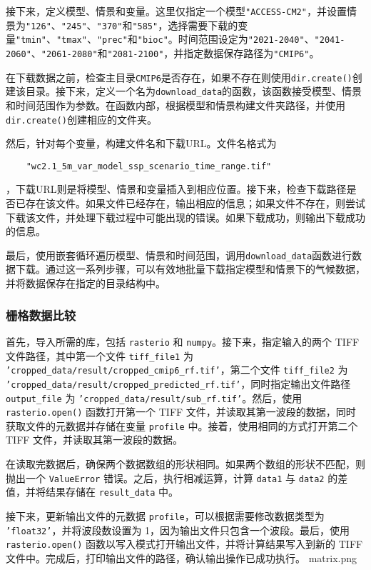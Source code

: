 \documentclass{article}
\begin{document}
接下来，定义模型、情景和变量。这里仅指定一个模型\texttt{"ACCESS-CM2"}，并设置情景为\texttt{"126"}、\texttt{"245"}、\texttt{"370"}和\texttt{"585"}，选择需要下载的变量\texttt{"tmin"}、\texttt{"tmax"}、\texttt{"prec"}和\texttt{"bioc"}。时间范围设定为\texttt{"2021-2040"}、\texttt{"2041-2060"}、\texttt{"2061-2080"}和\texttt{"2081-2100"}，并指定数据保存路径为\texttt{"CMIP6"}。

在下载数据之前，检查主目录\texttt{CMIP6}是否存在，如果不存在则使用\texttt{dir.create()}创建该目录。接下来，定义一个名为\texttt{download\_data}的函数，该函数接受模型、情景和时间范围作为参数。在函数内部，根据模型和情景构建文件夹路径，并使用\texttt{dir.create()}创建相应的文件夹。

然后，针对每个变量，构建文件名和下载URL。文件名格式为
\begin{lstlisting}
	"wc2.1_5m_var_model_ssp_scenario_time_range.tif"
\end{lstlisting}
，下载URL则是将模型、情景和变量插入到相应位置。接下来，检查下载路径是否已存在该文件。如果文件已经存在，输出相应的信息；如果文件不存在，则尝试下载该文件，并处理下载过程中可能出现的错误。如果下载成功，则输出下载成功的信息。

最后，使用嵌套循环遍历模型、情景和时间范围，调用\texttt{download\_data}函数进行数据下载。通过这一系列步骤，可以有效地批量下载指定模型和情景下的气候数据，并将数据保存在指定的目录结构中。


\subsubsection{栅格数据比较}
首先，导入所需的库，包括 \texttt{rasterio} 和 \texttt{numpy}。接下来，指定输入的两个 TIFF 文件路径，其中第一个文件 \texttt{tiff\_file1} 为 \texttt{'cropped\_data/result/cropped\_cmip6\_rf.tif'}，第二个文件 \texttt{tiff\_file2} 为 \texttt{'cropped\_data/result/cropped\_predicted\_rf.tif'}，同时指定输出文件路径 \texttt{output\_file} 为 \texttt{'cropped\_data/result/sub\_rf.tif'}。然后，使用 \texttt{rasterio.open()} 函数打开第一个 TIFF 文件，并读取其第一波段的数据，同时获取文件的元数据并存储在变量 \texttt{profile} 中。接着，使用相同的方式打开第二个 TIFF 文件，并读取其第一波段的数据。

在读取完数据后，确保两个数据数组的形状相同。如果两个数组的形状不匹配，则抛出一个 \texttt{ValueError} 错误。之后，执行相减运算，计算 \texttt{data1} 与 \texttt{data2} 的差值，并将结果存储在 \texttt{result\_data} 中。

接下来，更新输出文件的元数据 \texttt{profile}，可以根据需要修改数据类型为 \texttt{'float32'}，并将波段数设置为 1，因为输出文件只包含一个波段。最后，使用 \texttt{rasterio.open()} 函数以写入模式打开输出文件，并将计算结果写入到新的 TIFF 文件中。完成后，打印输出文件的路径，确认输出操作已成功执行。
matrix.png
\end{document}
